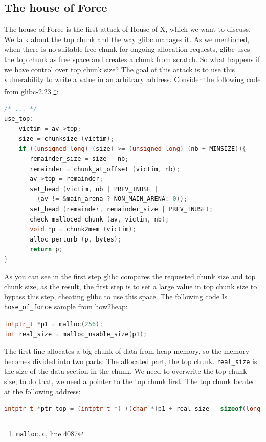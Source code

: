 \documentclass{masterthesis}
\newcommand*\libc{glibc}
\begin{document}
\subsection{The house of Force}
The house of Force is the first attack of House of X, which we want to discuss. We talk about the top chunk and the way \libc{} manages it. As we mentioned, when there is no suitable free chunk for ongoing allocation requests, \libc{} uses the top chunk as free space and creates a chunk from scratch. So what happens if we have control over top chunk size? The goal of this attack is to use this vulnerability to write a value in an arbitrary address. Consider the following code from \libc{-2.23} \footnote{\href{https://sourceware.org/git/?p=glibc.git;a=blob;f=malloc/malloc.c;h=f7cd29bc2f93e1082ee77800bd64a4b2a2897055;hb=9ea3686266dca3f004ba874745a4087a89682617\#l4087}{\texttt{malloc.c}, line 4087}}:
\begin{lstlisting}[language=c,frame=tlrb]
 /* ... */
use_top:
	victim = av->top;
	size = chunksize (victim);
	if ((unsigned long) (size) >= (unsigned long) (nb + MINSIZE)){
	   remainder_size = size - nb;
	   remainder = chunk_at_offset (victim, nb);
	   av->top = remainder;
	   set_head (victim, nb | PREV_INUSE |
	     (av != &main_arena ? NON_MAIN_ARENA: 0));
	   set_head (remainder, remainder_size | PREV_INUSE);
	   check_malloced_chunk (av, victim, nb);
	   void *p = chunk2mem (victim);
	   alloc_perturb (p, bytes);
	   return p;
}
\end{lstlisting}
As you can see in the first step \libc{} compares the requested chunk size and top chunk size, as the result, the first step is to set a large value in top chunk size to bypass this step, cheating \libc{} to use this space. The following code Is \lstinline{hose_of_force} sample from how2heap:

\begin{lstlisting}[language=c,frame=tlrb]
intptr_t *p1 = malloc(256);
int real_size = malloc_usable_size(p1);
\end{lstlisting}

The first line allocates a big chunk of data from heap memory, so the memory becomes divided into two parts: The allocated part, the top chunk. \lstinline{real_size} is the size of the data section in the chunk. We need to overwrite the top chunk size; to do that, we need a pointer to the top chunk first. The top chunk located at the following address:

\begin{lstlisting}[language=c,frame=tlrb]
intptr_t *ptr_top = (intptr_t *) ((char *)p1 + real_size - sizeof(long));
\end{lstlisting}
\end{document}
